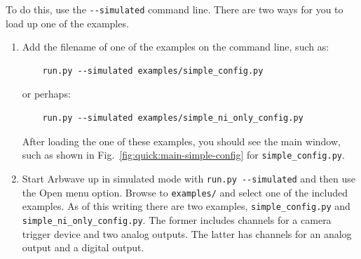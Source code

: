 To do this, use the \verb|--simulated| command line.  There are two ways for you
to load up one of the examples.
\begin{enumerate}
  \item Add the filename of one of the examples on the command line, such as:\\
    \begin{verbatim}
    run.py --simulated examples/simple_config.py
    \end{verbatim}
    or perhaps:
    \begin{verbatim}
    run.py --simulated examples/simple_ni_only_config.py
    \end{verbatim}
    After loading the one of these examples, you should see the main window,
    such as shown in Fig.~\ref{fig:quick:main-simple-config} for \verb|simple_config.py|.
  \item Start Arbwave up in simulated mode with \verb|run.py --simulated| and
  then use the Open menu option.  Browse to \verb|examples/| and select one of
  the included examples.  As of this writing there are two examples, \verb|simple_config.py|
  and \verb|simple_ni_only_config.py|.  The former includes channels for a camera trigger device
  and two analog outputs.  The latter has channels for an analog output and a digital output.
\end{enumerate}
